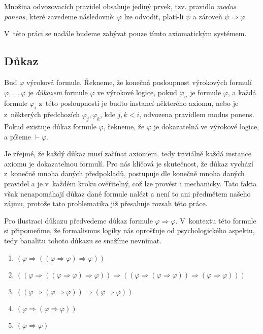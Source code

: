 \documentclass[thesis=B,czech,hidelinks]{FITthesis}[2012/06/26]
\begin{document}
Množina odvozovacích pravidel obsahuje jediný prvek, tzv. pravidlo \emph{modus ponens}, které zavedeme následovně: $\varphi$ lze odvodit, platí-li $\psi$ a zároveň $\psi \Rightarrow \varphi$.

V~této práci se nadále budeme zabývat pouze tímto axiomatickým systémem.

\subsection{Důkaz}

\begin{df}
Buď $\varphi$ výroková formule. Řekneme, že konečná posloupnost výrokových formulí $\varphi , \ldots, \varphi$ je \emph{důkazem} formule $\varphi$ ve výrokové logice, pokud $\varphi_n$ je formule $\varphi$, a každá formule $\varphi_i$ z~této posloupnosti je buďto instancí některého axiomu, nebo je z~některých předchozích $\varphi_j, \varphi_k$, kde $j, k < i$, odvozena pravidlem modus ponens. Pokud existuje důkaz formule $\varphi$, řekneme, že $\varphi$ je dokazatelná ve výrokové logice, a píšeme $\vdash \varphi$\cite{logika}.
\end{df}

Je zřejmé, že každý důkaz musí začínat axiomem, tedy triviálně každá instance axiomu je dokazatelnou formulí. Pro nás klíčová je skutečnost, že důkaz vychází z~konečně mnoha daných předpokladů, postupuje dle konečně mnoha daných pravidel a je v~každém kroku ověřitelný, což lze provést i mechanicky\cite{logika}. Tato fakta však nenapomáhají důkaz dané formule nalézt a není to ani předmětem našeho zájmu, protože tato problematika již přesahuje rozsah této práce.

\begin{ex}
\label{ex:proof}
	Pro ilustraci důkazu předvedeme důkaz formule $\varphi \Rightarrow \varphi$. V~kontextu této formule si připomeňme, že formalismus logiky nás oprošťuje od psychologického aspektu, tedy banalitu tohoto důkazu se snažíme nevnímat.
	
	\begin{enumerate}
		\item $(\varphi \Rightarrow ((\varphi \Rightarrow \varphi) \Rightarrow \varphi))$
		\item $((\varphi \Rightarrow ((\varphi \Rightarrow \varphi) \Rightarrow \varphi)) \Rightarrow ((\varphi \Rightarrow (\varphi \Rightarrow \varphi)) \Rightarrow (\varphi \Rightarrow \varphi)))$
		\item $((\varphi \Rightarrow (\varphi \Rightarrow \varphi)) \Rightarrow (\varphi \Rightarrow \varphi))$
		\item $(\varphi \Rightarrow (\varphi \Rightarrow \varphi))$
		\item $(\varphi \Rightarrow \varphi)$
	\end{enumerate}
\end{ex}
\end{document}
